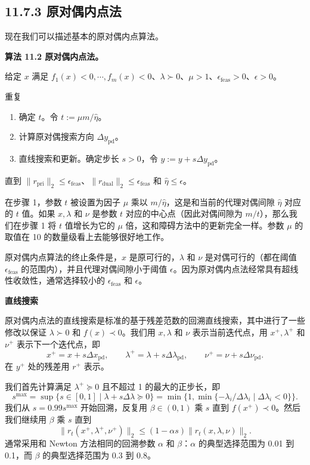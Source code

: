 \documentclass[UTF8, 12pt, fontset=fandol, oneside]{ctexart}
\begin{document}
\subsection*{11.7.3 原对偶内点法}

现在我们可以描述基本的原对偶内点算法。

\noindent\textbf{算法 11.2 原对偶内点法。}

给定 $x$ 满足 $f_1(x)<0,\cdots,f_m(x)<0$、$\lambda\succ 0$、$\mu>1$、$\epsilon_{\mathrm{feas}}>0$、$\epsilon>0$。

重复
\begin{enumerate}
\item 确定 $t$。令 $t:=\mu m/\hat{\eta}$。
\item 计算原对偶搜索方向 $\Delta y_{\mathrm{pd}}$。
\item 直线搜索和更新。确定步长 $s>0$，令 $y:=y+s\Delta y_{\mathrm{pd}}$。
\end{enumerate}
直到 $\|r_{\mathrm{pri}}\|_2\leq\epsilon_{\mathrm{feas}}$、$\|r_{\mathrm{dual}}\|_2\leq\epsilon_{\mathrm{feas}}$ 和 $\hat{\eta}\leq\epsilon$。

在步骤 1，参数 $t$ 被设置为因子 $\mu$ 乘以 $m/\hat{\eta}$，这是和当前的代理对偶间隙 $\hat{\eta}$ 对应的 $t$ 值。如果 $x,\lambda$ 和 $\nu$ 是参数 $t$ 对应的中心点（因此对偶间隙为 $m/t$），那么我们在步骤 1 将 $t$ 值增长为它的 $\mu$ 倍，这和障碍方法中的更新完全一样。参数 $\mu$ 的取值在 10 的数量级看上去能够很好地工作。

原对偶内点算法的终止条件是，$x$ 是原可行的，$\lambda$ 和 $\nu$ 是对偶可行的（都在阈值 $\epsilon_{\mathrm{feas}}$ 的范围内），并且代理对偶间隙小于阈值 $\epsilon$。因为原对偶内点法经常具有超线性收敛性，通常选择较小的 $\epsilon_{\mathrm{feas}}$ 和 $\epsilon$。

\noindent\textbf{直线搜索}

原对偶内点法的直线搜索是标准的基于残差范数的回溯直线搜索，其中进行了一些修改以保证 $\lambda\succ 0$ 和 $f(x)\prec 0$。我们用 $x,\lambda$ 和 $\nu$ 表示当前迭代点，用 $x^+,\lambda^+$ 和 $\nu^+$ 表示下一个迭代点，即
\[
x^+=x+s\Delta x_{\mathrm{pd}},\qquad
\lambda^+=\lambda+s\Delta\lambda_{\mathrm{pd}},\qquad
\nu^+=\nu+s\Delta\nu_{\mathrm{pd}}.
\]
在 $y^+$ 处的残差用 $r^+$ 表示。

我们首先计算满足 $\lambda^+\succeq 0$ 且不超过 1 的最大的正步长，即
\[
s^{\max}=\sup\{s\in[0,1]\mid \lambda+s\Delta\lambda\succeq0\}
=\min\{1,\min\{-\lambda_i/\Delta\lambda_i\mid \Delta\lambda_i<0\}\}.
\]
我们从 $s=0.99s^{\max}$ 开始回溯，反复用 $\beta\in(0,1)$ 乘 $s$ 直到 $f(x^+)\prec0$。然后我们继续用 $\beta$ 乘 $s$ 直到
\[
\|r_t(x^+,\lambda^+,\nu^+)\|_2\leq (1-\alpha s)\|r_t(x,\lambda,\nu)\|_2.
\]
通常采用和 Newton 方法相同的回溯参数 $\alpha$ 和 $\beta$：$\alpha$ 的典型选择范围为 0.01 到 0.1，而 $\beta$ 的典型选择范围为 0.3 到 0.8。
\end{document}
